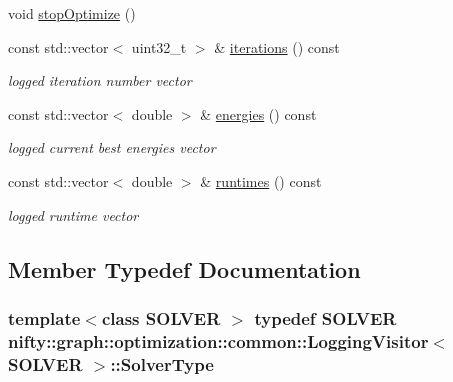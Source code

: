 \begin{DoxyCompactItemize}
\item 
void \hyperlink{classnifty_1_1graph_1_1optimization_1_1common_1_1LoggingVisitor_abce5bb67a05da90465eeb020c90210ba}{stop\+Optimize} ()
\item 
const std\+::vector$<$ uint32\+\_\+t $>$ \& \hyperlink{classnifty_1_1graph_1_1optimization_1_1common_1_1LoggingVisitor_a526c951d42128b2538f31ac029507c25}{iterations} () const 
\begin{DoxyCompactList}\small\item\em logged iteration number vector \end{DoxyCompactList}\item 
const std\+::vector$<$ double $>$ \& \hyperlink{classnifty_1_1graph_1_1optimization_1_1common_1_1LoggingVisitor_aebcf36bb46057979ecf18cedf6aeadbe}{energies} () const 
\begin{DoxyCompactList}\small\item\em logged current best energies vector \end{DoxyCompactList}\item 
const std\+::vector$<$ double $>$ \& \hyperlink{classnifty_1_1graph_1_1optimization_1_1common_1_1LoggingVisitor_a5c20b8621b87d4d188685694672e7b48}{runtimes} () const 
\begin{DoxyCompactList}\small\item\em logged runtime vector \end{DoxyCompactList}\end{DoxyCompactItemize}


\subsection{Member Typedef Documentation}
\hypertarget{classnifty_1_1graph_1_1optimization_1_1common_1_1LoggingVisitor_a948f90213104a37e586b5024cb918f40}{}
\subsubsection[{Solver\+Type}]{\setlength{\rightskip}{0pt plus 5cm}template$<$class S\+O\+L\+V\+E\+R $>$ typedef S\+O\+L\+V\+E\+R {\bf nifty\+::graph\+::optimization\+::common\+::\+Logging\+Visitor}$<$ S\+O\+L\+V\+E\+R $>$\+::{\bf Solver\+Type}}\label{classnifty_1_1graph_1_1optimization_1_1common_1_1LoggingVisitor_a948f90213104a37e586b5024cb918f40}
\hypertarget{classnifty_1_1graph_1_1optimization_1_1common_1_1LoggingVisitor_a38539dee10778eecf56be540fd64eea2}{}
